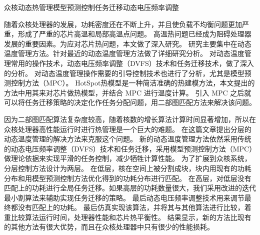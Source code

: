 
\begin{Cabstract}{众核}{动态热管理}{模型预测控制}{任务迁移}{动态电压频率调整}

随着众核处理器的发展，功耗密度还在不断上升，并且使负载不均衡问题更加严重，形成了严重的芯片高温和局部高温点问题。
高温热问题已经成为阻碍处理器发展的重要因素。为应对芯片热问题，本文做了深入研究。
研究主要集中在动态温度管理方法。针对最近的动态温度管理方法做了详细研究分析。
对动态温度管理常用的操作技术，动态电压频率调整（DVFS）技术和任务迁移技术，做了深入的分析。
对动态温度管理操作需要的引导控制技术也进行了分析，尤其是模型预测控制方法（MPC）。
HotSpot热模型是一种简洁准确的热建模方法，本文提出的方法中用其来对芯片做热模型，并结合 MPC 进行温度计算。
引入 MPC 之后就可以将任务迁移策略的决定化作任务分配问题，用二部图匹配方法来解决该问题。

因为二部图匹配算法复杂度较高，随着核数的增长算法计算时间显著增加，所以在众核处理器高性能运行时进行热管理是一个巨大的难题。
在这篇文章提出分层的动态温度管理的解决方法来克服这个问题。
新的动态温度管理方法依然采用传统的动态电压频率调整（DVFS）技术和任务迁移，采用模型预测控制方法（MPC）做理论依据来实现平滑的任务控制，减少牺牲计算性能。
为了扩展到众核系统，分层控制方法设计为两层。
在低层，核在空间上被分割成块，块内用现有的功耗分布和用模型预测控制方法优化得到的功耗分布进行匹配。
在高层，对低层没有匹配上的功耗进行全局任务迁移。如果高层的功耗数量很大，我们采用改进的迭代最小割算法来辅助实现任务迁移的策略。
最后动态电压频率调整技术用来调节最终都没有匹配上的功耗。
最后仿真实现该算法，并将其与其他算法进行比较，着重比较算法运行时间，处理器性能和芯片热平衡性。
结果显示，新的方法比现有的其他方法有很大优势，而且在众核处理器中只有很少的性能损耗。
\end{Cabstract}
